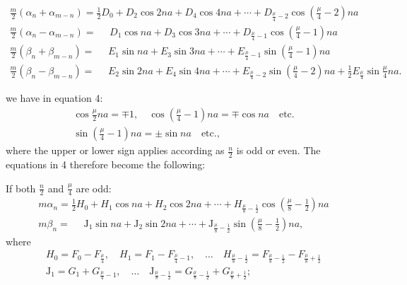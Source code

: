\begin{landscape}
\[\begin{array}{l}
\frac{m}{2}(\alpha_n+\alpha_{m-n}) = \tfrac{1}{2}D_0 + D_2\cos 2na + D_4\cos 4na + \cdots + D_{\frac{\mu}{4}-2}\cos\left(\frac{\mu}{4}-2\right)na \\[4pt]
\frac{m}{2}(\alpha_n-\alpha_{m-n}) = \phantom{{}={}} D_1\cos na + D_3\cos 3na + \cdots + D_{\frac{\mu}{4}-1}\cos\left(\frac{\mu}{4}-1\right)na \\[4pt]
\frac{m}{2}(\beta_n+\beta_{m-n}) = \phantom{{}={}} E_1\sin na + E_3\sin 3na + \cdots + E_{\frac{\mu}{4}-1}\sin\left(\frac{\mu}{4}-1\right)na \\[4pt]
\frac{m}{2}(\beta_n-\beta_{m-n}) = \phantom{{}={}} E_2\sin 2na + E_4\sin 4na + \cdots + E_{\frac{\mu}{4}-2}\sin\left(\frac{\mu}{4}-2\right)na + \tfrac{1}{2}E_{\frac{\mu}{4}}\sin\frac{\mu}{4}na.
\end{array}
\]
\par\nobreak\medskip\noindent\hfill{}\hfill\mbox{}\par\nobreak\smallskip\noindent
we have in \VtwoLowPoint equation 4:
\[
\begin{gathered}
\cos\frac{\mu}{2}na = \mp 1, \quad \cos\left(\frac{\mu}{4}-1\right)na = \mp\cos na \quad \text{etc.}\\[4pt]
\sin\left(\frac{\mu}{4}-1\right)na = \pm\sin na \quad \text{etc.,}
\end{gathered}
\]
where the upper or lower sign applies according as \(\frac{n}{2}\) is odd or even. The equations in 4 therefore become the following:
\par\noindent\hspace*{\parindent}If both \(\frac{n}{2}\) and \(\frac{\mu}{4}\) are odd:
\[
\tag*{7)}
\begin{array}{l}
m\alpha_n = \tfrac{1}{2}H_0 + H_1\cos na + H_2\cos 2na + \cdots + H_{\frac{\mu}{8}-\frac{1}{2}}\cos\left(\frac{\mu}{8}-\frac{1}{2}\right)na \\[4pt]
m\beta_n = \phantom{{}={}} \mathrm{J}_1\sin na + \mathrm{J}_2\sin 2na + \cdots + \mathrm{J}_{\frac{\mu}{8}-\frac{1}{2}}\sin\left(\frac{\mu}{8}-\frac{1}{2}\right)na,
\end{array}
\]
where
\[
\begin{gathered}
H_0 = F_0 - F_{\frac{\mu}{4}}, \quad H_1 = F_1 - F_{\frac{\mu}{4}-1}, \quad \ldots \quad H_{\frac{\mu}{8}-\frac{1}{2}} = F_{\frac{\mu}{8}-\frac{1}{2}} - F_{\frac{\mu}{8}+\frac{1}{2}}\\[4pt]
\mathrm{J}_1 = G_1 + G_{\frac{\mu}{4}-1}, \quad \ldots \quad \mathrm{J}_{\frac{\mu}{8}-\frac{1}{2}} = G_{\frac{\mu}{8}-\frac{1}{2}} + G_{\frac{\mu}{8}+\frac{1}{2}};

\end{gathered}\]
\end{landscape}
